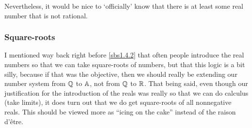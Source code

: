 Nevertheless, it would be nice to `officially' know that there is at least some real number that is not rational.

\subsubsection{Square-roots}

I mentioned way back right before \cref{sbs1.4.2}  that often people introduce the real numbers so that we can take square-roots of numbers, but that this logic is a bit silly, because if that was the objective, then we should really be extending our number system from $\mathbb{Q}$ to $\mathbb{A}$, not from $\mathbb{Q}$ to $\mathbb{R}$.  That being said, even though our justification for the introduction of the reals was really so that we can do calculus (take limits), it does turn out that we do get square-roots of all nonnegative reals.  This should be viewed more as ``icing on the cake'' instead of the raison d'\^{e}tre.

